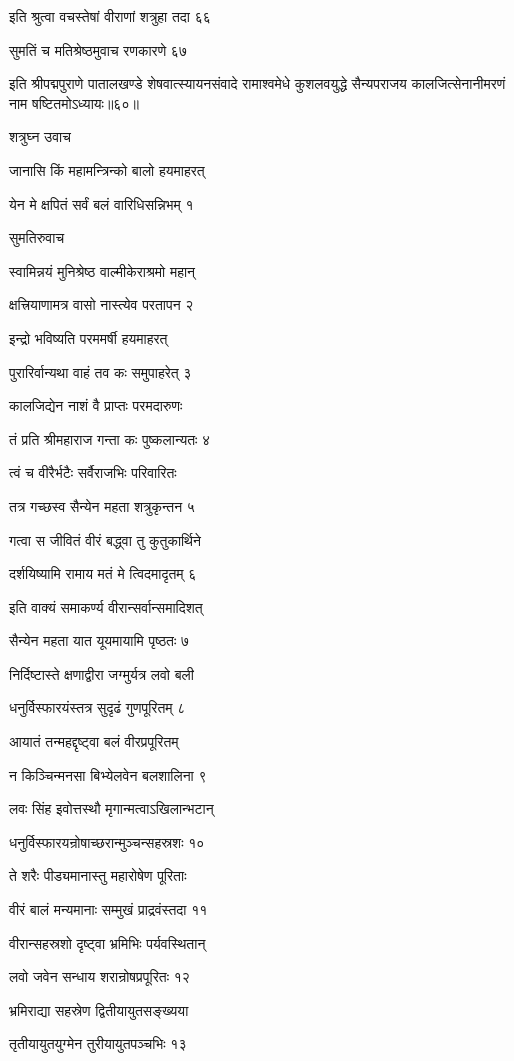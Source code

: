 इति श्रुत्वा वचस्तेषां वीराणां शत्रुहा तदा ६६

सुमतिं च मतिश्रेष्ठमुवाच रणकारणे ६७

इति श्रीपद्मपुराणे पातालखण्डे शेषवात्स्यायनसंवादे रामाश्वमेधे कुशलवयुद्धे सैन्यपराजय कालजित्सेनानीमरणं नाम षष्टितमोऽध्यायः॥६०॥


शत्रुघ्न उवाच

जानासि किं महामन्त्रिन्को बालो हयमाहरत्

येन मे क्षपितं सर्वं बलं वारिधिसन्निभम् १

सुमतिरुवाच

स्वामिन्नयं मुनिश्रेष्ठ वाल्मीकेराश्रमो महान्

क्षत्त्रियाणामत्र वासो नास्त्येव परतापन २

इन्द्रो भविष्यति परममर्षी हयमाहरत्

पुरारिर्वान्यथा वाहं तव कः समुपाहरेत् ३

कालजिद्येन नाशं वै प्राप्तः परमदारुणः

तं प्रति श्रीमहाराज गन्ता कः पुष्कलान्यतः ४

त्वं च वीरैर्भटैः सर्वैराजभिः परिवारितः

तत्र गच्छस्व सैन्येन महता शत्रुकृन्तन ५

गत्वा स जीवितं वीरं बद्ध्वा तु कुतुकार्थिने

दर्शयिष्यामि रामाय मतं मे त्विदमादृतम् ६

इति वाक्यं समाकर्ण्य वीरान्सर्वान्समादिशत्

सैन्येन महता यात यूयमायामि पृष्ठतः ७

निर्दिष्टास्ते क्षणाद्वीरा जग्मुर्यत्र लवो बली

धनुर्विस्फारयंस्तत्र सुदृढं गुणपूरितम् ८

आयातं तन्महद्दृष्ट्वा बलं वीरप्रपूरितम्

न किञ्चिन्मनसा बिभ्येलवेन बलशालिना ९

लवः सिंह इवोत्तस्थौ मृगान्मत्वाऽखिलान्भटान्

धनुर्विस्फारयन्रोषाच्छरान्मुञ्चन्सहस्रशः १०

ते शरैः पीड्यमानास्तु महारोषेण पूरिताः

वीरं बालं मन्यमानाः सम्मुखं प्राद्रवंस्तदा ११

वीरान्सहस्रशो दृष्ट्वा भ्रमिभिः पर्यवस्थितान्

लवो जवेन सन्धाय शरान्रोषप्रपूरितः १२

भ्रमिराद्या सहस्रेण द्वितीयायुतसङ्ख्यया

तृतीयायुतयुग्मेन तुरीयायुतपञ्चभिः १३

